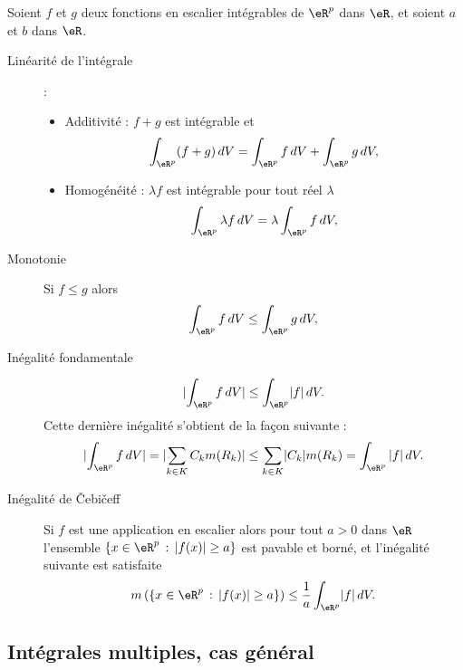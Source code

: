 Soient \( f\) et \( g\) deux fonctions en escalier intégrables de \( \eR^p\) dans \( \eR\), et soient \( a\) et \( b\) dans \( \eR\).
\begin{description}
	\item[Linéarité de l'intégrale] :
	      \begin{itemize}
		      \item Additivité : \( f+g\) est intégrable et
		            \[
			            \int_{\eR^p} (f+g)\, dV = \int_{\eR^p} f\, dV+ \int_{\eR^p} g\, dV,
		            \]
		      \item Homogénéité : \( \lambda f\) est intégrable pour tout réel \( \lambda\)
		            \[
			            \int_{\eR^p} \lambda  f\, dV = \lambda\int_{\eR^p} f\, dV,
		            \]
	      \end{itemize}
	\item[Monotonie] Si \( f\leq g\) alors
	      \[
		      \int_{\eR^p} f\, dV\leq \int_{\eR^p} g\, dV,
	      \]
	\item[Inégalité fondamentale]
	      \[
		      \lvert \int_{\eR^p}f\,dV\rvert \leq\int_{\eR^p}\lvert f\rvert\,dV.
	      \]
	      Cette dernière inégalité s'obtient de la façon suivante :
	      \[
		      \lvert\int_{\eR^p}f\,dV\rvert =\lvert \sum_{k\in K} C_k m(R_k)\rvert \leq\sum_{k\in K}\lvert C_k\rvert m(R_k)=\int_{\eR^p}|f|\,dV.
	      \]
	\item[Inégalité de Čebičeff]  Si \( f\) est une application en escalier alors pour tout \( a>0\) dans \( \eR\) l'ensemble \( \{x\in\eR^p\,:\, |f(x)|\geq a\}\) est pavable et borné, et l'inégalité suivante est satisfaite
	      \[
		      m\left(\{x\in\eR^p\,:\, |f(x)|\geq a\}\right)\leq \frac{1}{a} \int_{\eR^p}\lvert f\rvert\,dV.
	      \]
\end{description}

\subsection{Intégrales multiples, cas général}

